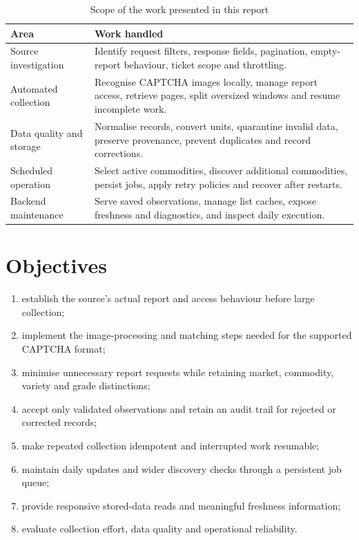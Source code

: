 \documentclass[12pt,a4paper,oneside]{report}
\numberwithin{equation}{chapter}
\numberwithin{figure}{chapter}
\numberwithin{table}{chapter}
\theoremstyle{definition}
\begin{document}
\begin{table}[H]
\centering
\caption{Scope of the work presented in this report}
\label{tab:workscope}
\small
\begin{tabular}{@{}p{}p{}@{}}
\toprule
Area & Work handled \\
\midrule
Source investigation & Identify request filters, response fields, pagination, empty-report behaviour, ticket scope and throttling. \\
Automated collection & Recognise CAPTCHA images locally, manage report access, retrieve pages, split oversized windows and resume incomplete work. \\
Data quality and storage & Normalise records, convert units, quarantine invalid data, preserve provenance, prevent duplicates and record corrections. \\
Scheduled operation & Select active commodities, discover additional commodities, persist jobs, apply retry policies and recover after restarts. \\
Backend maintenance & Serve saved observations, manage list caches, expose freshness and diagnostics, and inspect daily execution. \\
\bottomrule
\end{tabular}
\end{table}

\section{Objectives}
\begin{enumerate}
  \item establish the source's actual report and access behaviour before large collection;
  \item implement the image-processing and matching steps needed for the supported CAPTCHA format;
  \item minimise unnecessary report requests while retaining market, commodity, variety and grade distinctions;
  \item accept only validated observations and retain an audit trail for rejected or corrected records;
  \item make repeated collection idempotent and interrupted work resumable;
  \item maintain daily updates and wider discovery checks through a persistent job queue;
  \item provide responsive stored-data reads and meaningful freshness information;
  \item evaluate collection effort, data quality and operational reliability.
\end{enumerate}
\end{document}
